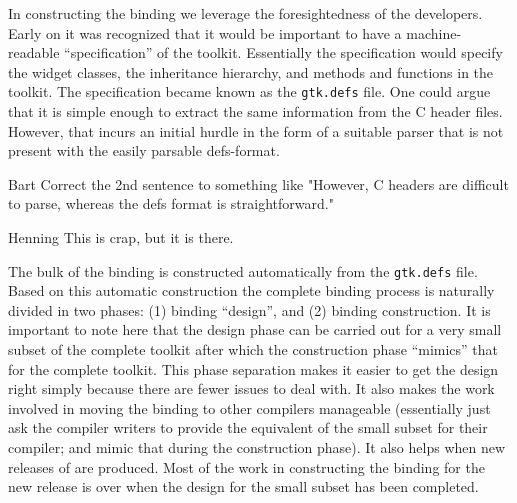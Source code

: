 \documentclass[workingdraft]{usetex-v1}
\begin{document}
In constructing the \mgtk binding we leverage the foresightedness of
the \gtk developers. Early on it was recognized that it would be
important to have a machine-readable ``specification'' of the toolkit.
Essentially the specification would specify the widget classes, the
inheritance hierarchy, and methods and functions in the toolkit. The
specification became known as the \texttt{gtk.defs} file. One could
argue that it is simple enough to extract the same information from
the C header files. However, that incurs an initial hurdle in the
form of a suitable parser that is not present with the easily parsable
defs-format.
\begin{ednote}{Bart}
  Correct the 2nd sentence to something like "However, C headers are
  difficult to parse, whereas the defs format is straightforward."
\end{ednote}


\begin{ednote}{Henning} This is crap, but it is there. \end{ednote}

The bulk of the \mgtk binding is constructed automatically from the
\texttt{gtk.defs} file. Based on this automatic construction the
complete binding process is naturally divided in two phases: (1)
binding ``design'', and (2) binding construction. It is important to
note here that the design phase can be carried out for a very small
subset of the complete toolkit after which the construction phase
``mimics'' that for the complete toolkit.
This phase separation makes it easier to get the design right simply
because there are fewer issues to deal with.  It also makes the work
involved in moving the binding to other \sml compilers manageable
(essentially just ask the compiler writers to provide the equivalent
of the small subset for their compiler; and mimic that during the
construction phase). It also helps when new releases of \gtk are
produced. Most of the work in constructing the binding for the new
release is over when the design for the small subset has been completed.
\end{document}
